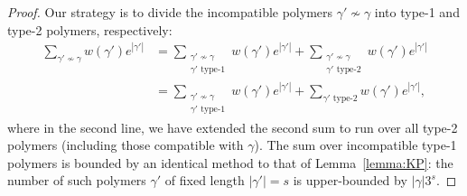 \begin{proof}
    Our strategy is to divide the incompatible polymers $\gamma' \nsim \gamma$ into type-1 and type-2 polymers, respectively:
    \begin{equation}
        \begin{split}
            \sum_{\gamma' \nsim \gamma} w(\gamma') e^{|\gamma'|} &= \sum_{\substack{\gamma' \nsim \gamma \\ \gamma' \text{ type-1}}} w(\gamma') e^{|\gamma'|} + \sum_{\substack{\gamma' \nsim \gamma \\ \gamma' \text{ type-2}}} w(\gamma') e^{|\gamma'|} \\
            &= \sum_{\substack{\gamma' \nsim \gamma \\ \gamma' \text{ type-1}}} w(\gamma') e^{|\gamma'|} + \sum_{\gamma' \text{ type-2}} w(\gamma') e^{|\gamma'|} ,
        \end{split}
    \end{equation}
    where in the second line, we have extended the second sum to run over all type-2 polymers (including those compatible with $\gamma$). The sum over incompatible type-1 polymers is bounded by an identical method to that of Lemma~\ref{lemma:KP}: the number of such polymers $\gamma'$ of fixed length $|\gamma'| = s$ is upper-bounded by $|\gamma| 3^s$. 
    

\end{proof}

